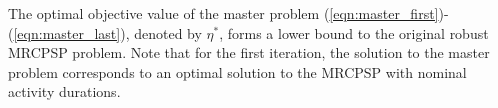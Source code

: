 \documentclass[a4paper,abstracton]{scrartcl}
\begin{document}
The optimal objective value of the master problem (\ref{eqn:master_first})-(\ref{eqn:master_last}), denoted by $\eta^*$, forms a lower bound to the original robust MRCPSP problem. Note that for the first iteration, the solution to the master problem corresponds to an optimal solution to the MRCPSP with nominal activity durations. 

\end{document}
